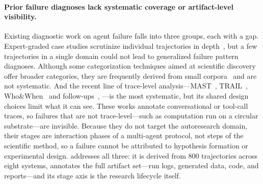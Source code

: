 \paragraph{Prior failure diagnoses lack systematic coverage or artifact-level visibility.}
Existing diagnostic work on agent failure falls into three groups, each with a
gap. Expert-graded case studies scrutinize individual trajectories in
depth~\citep{kirgis2026shadow, li2026scicomp, rawat2026plausible,
horstmann2026neuro, eulig2026cawm, trehan2026llmsarentscientistsyet, zhang2026far}, but a few trajectories in a single domain could not lead to generalized failure pattern diagnoses. Although some categorization techniques aimed at scientific discovery offer broader categories, they are frequently derived from small
corpora~\citep{luo2025automateseehiddenpitfalls, eulig2026cawm, bisht2026agenticaiscientistsbuilt} and are not systematic. And the recent line of trace-level
analysis---MAST~\citep{cemri2026multi}, TRAIL~\citep{deshpande2025trailtracereasoningagentic},
Who\&When~\citep{zhang2025agent} and
follow-ups~\citep{rafi2026falat, zhu2026stepfinder},
\citep{zhan2026your}---is the most systematic, but its shared design choices
limit what it can see. These works annotate conversational or tool-call traces,
so failures that are not trace-level---such as computation run on a
circular substrate---are invisible. Because they do not target the autoresearch domain, their stages are interaction phases of a
multi-agent protocol, not steps of the scientific method, so a failure cannot
be attributed to hypothesis formation or experimental design. \taxonomy addresses all three: it is derived from 800 trajectories across eight
systems, annotates the full artifact set---run logs, generated data, code, and
reports---and its stage axis is the research lifecycle itself.